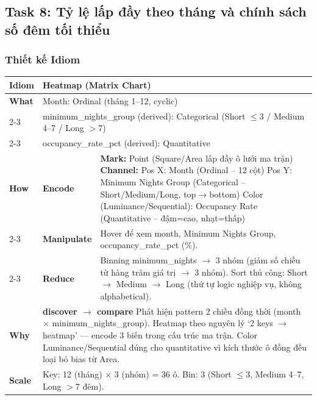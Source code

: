 \subsection{Task 8: Tỷ lệ lấp đầy theo tháng và chính sách số đêm tối thiểu}

\subsubsection{Thiết kế Idiom}

\begin{table}[H]
\centering
\renewcommand{\arraystretch}{1.1}
\begin{tabularx}{\textwidth}{|l|l|X|}
\hline
\textbf{Idiom} & \multicolumn{2}{l|}{\textbf{Heatmap (Matrix Chart)}} \\ \hline
\textbf{What}
& \multicolumn{2}{X|}{Month: Ordinal (tháng 1--12, cyclic)} \\ \cline{2-3}
& \multicolumn{2}{X|}{minimum\_nights\_group (derived): Categorical (Short $\leq$3 / Medium 4--7 / Long $>$7)} \\ \cline{2-3}
& \multicolumn{2}{X|}{occupancy\_rate\_pct (derived): Quantitative} \\ \hline
\textbf{How}
& \textbf{Encode} &
\textbf{Mark:} Point (Square/Area lấp đầy ô lưới ma trận) \newline
\textbf{Channel:} \newline
\hspace*{1em} Pos X: Month (Ordinal -- 12 cột) \newline
\hspace*{1em} Pos Y: Minimum Nights Group (Categorical -- Short/Medium/Long, top$\rightarrow$bottom) \newline
\hspace*{1em} Color (Luminance/Sequential): Occupancy Rate (Quantitative -- đậm=cao, nhạt=thấp) \\ \cline{2-3}
& \textbf{Manipulate} &
Hover để xem month, Minimum Nights Group, occupancy\_rate\_pct (\%). \\ \cline{2-3}
& \textbf{Reduce} &
Binning minimum\_nights $\rightarrow$ 3 nhóm (giảm số chiều từ hàng trăm giá trị $\rightarrow$ 3 nhóm). \newline
Sort thủ công: Short $\rightarrow$ Medium $\rightarrow$ Long (thứ tự logic nghiệp vụ, không alphabetical). \\ \hline
\textbf{Why} & \multicolumn{2}{X|}{
\textbf{discover $\rightarrow$ compare} \newline
Phát hiện pattern 2 chiều đồng thời (month $\times$ minimum\_nights\_group). Heatmap theo nguyên lý `2 keys $\rightarrow$ heatmap' --- encode 3 biến trong cấu trúc ma trận. Color Luminance/Sequential đúng cho quantitative vì kích thước ô đồng đều loại bỏ bias từ Area.
} \\ \hline
\textbf{Scale} & \multicolumn{2}{X|}{
Key: 12 (tháng) $\times$ 3 (nhóm) = 36 ô. \newline
Bin: 3 (Short $\leq$3, Medium 4--7, Long $>$7 đêm).
} \\ \hline
\end{tabularx}
\end{table}

